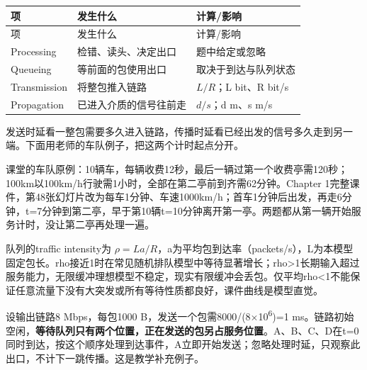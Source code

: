 \begingroup
\small\setlength{\tabcolsep}{3pt}
\renewcommand{\arraystretch}{1.22}
\begin{longtable}{@{}>{\raggedright\arraybackslash}p{}>{\raggedright\arraybackslash}p{}>{\raggedright\arraybackslash}p{}@{}}
\toprule
项 & 发生什么 & 计算/影响 \\
\midrule\endfirsthead
项 & 发生什么 & 计算/影响 \\
\midrule\endhead
\bottomrule\endfoot
Processing & 检错、读头、决定出口 & 题中给定或忽略 \\
Queueing & 等前面的包使用出口 & 取决于到达与队列状态 \\
Transmission & 将整包推入链路 & \(L/R\)；L bit、R bit/s \\
Propagation & 已进入介质的信号往前走 & \(d/s\)；d m、s m/s \\
\end{longtable}
\endgroup




发送时延看一整包需要多久进入链路，传播时延看已经出发的信号多久走到另一端。下面用老师的车队例子，把这两个计时起点分开。


课堂的车队原例：10辆车，每辆收费12秒，最后一辆过第一个收费亭需120秒；100km以100km/h行驶需1小时，全部在第二亭前到齐需62分钟。Chapter 1完整课件，第48张幻灯片改为每车1分钟、车速1000km/h；首车1分钟后出发，再走6分钟，t=7分钟到第二亭，早于第10辆t=10分钟离开第一亭。两题都从第一辆开始服务计时，没让第二亭再处理一遍。


队列的traffic intensity为 \(\rho=La/R\)，a为平均包到达率（packets/s），L为本模型固定包长。rho接近1时在常见随机排队模型中等待显著增长；rho>1长期输入超过服务能力，无限缓冲理想模型不稳定，现实有限缓冲会丢包。仅平均rho<1不能保证任意流量下没有大突发或所有等待性质都良好，课件曲线是模型直觉。









设输出链路8 Mbps，每包1000 B，发送一个包需8000/(8\ensuremath{\times}10\textsuperscript{6})=1 ms。链路初始空闲，\textbf{等待队列只有两个位置，正在发送的包另占服务位置}。A、B、C、D在t=0同时到达，按这个顺序处理到达事件，A立即开始发送；忽略处理时延，只观察此出口，不计下一跳传播。这是教学补充例子。


